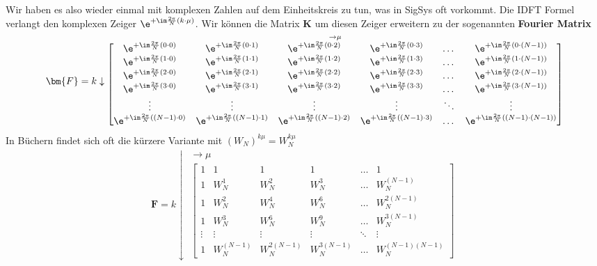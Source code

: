 Wir haben es also wieder einmal mit komplexen Zahlen auf dem Einheitskreis zu
tun, was in SigSys oft vorkommt.
%
Die IDFT Formel verlangt den komplexen Zeiger $\e^{+\im\frac{2\pi}{N} (k\cdot \mu)}$.
Wir können die Matrix $\bm{K}$ um diesen Zeiger erweitern zu der sogenannten
\textbf{Fourier Matrix}
\begin{align}
\label{eq:FourierMatrix}
\bm{F} =
k \downarrow
\substack{\rightarrow \mu\\
\begin{bmatrix}
\e^{+\im\frac{2\pi}{N} (0 \cdot 0)} & \e^{+\im\frac{2\pi}{N} (0 \cdot 1)} & \e^{+\im\frac{2\pi}{N} (0 \cdot 2)} & \e^{+\im\frac{2\pi}{N} (0 \cdot 3)} & \dots & \e^{+\im\frac{2\pi}{N} (0 \cdot (N-1))}\\
\e^{+\im\frac{2\pi}{N} (1 \cdot 0)} & \e^{+\im\frac{2\pi}{N} (1 \cdot 1)} & \e^{+\im\frac{2\pi}{N} (1 \cdot 2)} & \e^{+\im\frac{2\pi}{N} (1 \cdot 3)} & \dots & \e^{+\im\frac{2\pi}{N} (1 \cdot (N-1))} \\
\e^{+\im\frac{2\pi}{N} (2 \cdot 0)} & \e^{+\im\frac{2\pi}{N} (2 \cdot 1)} & \e^{+\im\frac{2\pi}{N} (2 \cdot 2)} & \e^{+\im\frac{2\pi}{N} (2 \cdot 3)} & \dots & \e^{+\im\frac{2\pi}{N} (2 \cdot (N-1))}\\
\e^{+\im\frac{2\pi}{N} (3 \cdot 0)} & \e^{+\im\frac{2\pi}{N} (3 \cdot 1)} & \e^{+\im\frac{2\pi}{N} (3 \cdot 2)} & \e^{+\im\frac{2\pi}{N} (3 \cdot 3)} & \dots & \e^{+\im\frac{2\pi}{N} (3 \cdot (N-1))}\\
\vdots & \vdots & \vdots & \vdots & \ddots & \vdots\\
\e^{+\im\frac{2\pi}{N} ((N-1) \cdot 0)} & \e^{+\im\frac{2\pi}{N} ((N-1) \cdot 1)} & \e^{+\im\frac{2\pi}{N} ((N-1) \cdot 2)} & \e^{+\im\frac{2\pi}{N} ((N-1) \cdot 3)} & \dots &  \e^{+\im\frac{2\pi}{N} ((N-1) \cdot (N-1))}
\end{bmatrix}
}
\end{align}
In Büchern findet sich oft die kürzere Variante mit $(W_N)^{k \mu} = W_N^{k \mu}$
\begin{align}
\bm{F} =
k \downarrow
\substack{\rightarrow \mu\\
\begin{bmatrix}
1 & 1 & 1 & 1 & \dots & 1\\[1em]
1 & W_N^1 & W_N^2 & W_N^3 & \dots & W_N^{(N-1)}\\[1em]
1 & W_N^2 & W_N^4 & W_N^6 & \dots & W_N^{2(N-1)}\\[1em]
1 & W_N^3 & W_N^6 & W_N^9 & \dots & W_N^{3(N-1)}\\[1em]
\vdots & \vdots & \vdots &\vdots &\ddots & \vdots\\[1em]
1 & W_N^{(N-1)} & W_N^{2(N-1)} & W_N^{3(N-1)} & \dots & W_N^{(N-1)(N-1)}
\end{bmatrix}
}
\end{align}
